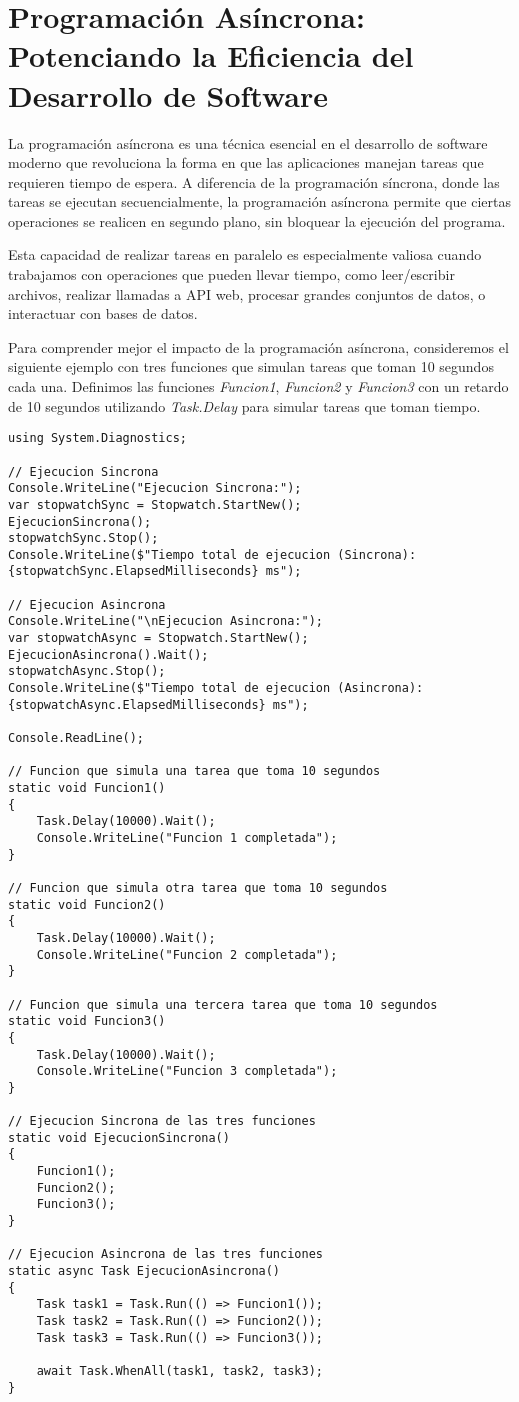 \documentclass[executivepaper]{article}
\begin{document}
\section{Programación Asíncrona: Potenciando la Eficiencia del Desarrollo de Software}

La programación asíncrona es una técnica esencial en el desarrollo de software moderno que revoluciona la forma en que las aplicaciones manejan tareas que requieren tiempo de espera. A diferencia de la programación síncrona, donde las tareas se ejecutan secuencialmente, la programación asíncrona permite que ciertas operaciones se realicen en segundo plano, sin bloquear la ejecución del programa.

Esta capacidad de realizar tareas en paralelo es especialmente valiosa cuando trabajamos con operaciones que pueden llevar tiempo, como leer/escribir archivos, realizar llamadas a API web, procesar grandes conjuntos de datos, o interactuar con bases de datos.

Para comprender mejor el impacto de la programación asíncrona, consideremos el siguiente ejemplo con tres funciones que simulan tareas que toman 10 segundos cada una. Definimos las funciones \emph{Funcion1}, \emph{Funcion2} y \emph{Funcion3} con un retardo de 10 segundos utilizando \emph{Task.Delay} para simular tareas que toman tiempo.

\begin{lstlisting}
using System.Diagnostics;

// Ejecucion Sincrona
Console.WriteLine("Ejecucion Sincrona:");
var stopwatchSync = Stopwatch.StartNew();
EjecucionSincrona();
stopwatchSync.Stop();
Console.WriteLine($"Tiempo total de ejecucion (Sincrona): {stopwatchSync.ElapsedMilliseconds} ms");

// Ejecucion Asincrona
Console.WriteLine("\nEjecucion Asincrona:");
var stopwatchAsync = Stopwatch.StartNew();
EjecucionAsincrona().Wait();
stopwatchAsync.Stop();
Console.WriteLine($"Tiempo total de ejecucion (Asincrona): {stopwatchAsync.ElapsedMilliseconds} ms");

Console.ReadLine();

// Funcion que simula una tarea que toma 10 segundos
static void Funcion1()
{
    Task.Delay(10000).Wait();
    Console.WriteLine("Funcion 1 completada");
}

// Funcion que simula otra tarea que toma 10 segundos
static void Funcion2()
{
    Task.Delay(10000).Wait();
    Console.WriteLine("Funcion 2 completada");
}

// Funcion que simula una tercera tarea que toma 10 segundos
static void Funcion3()
{
    Task.Delay(10000).Wait();
    Console.WriteLine("Funcion 3 completada");
}

// Ejecucion Sincrona de las tres funciones
static void EjecucionSincrona()
{
    Funcion1();
    Funcion2();
    Funcion3();
}

// Ejecucion Asincrona de las tres funciones
static async Task EjecucionAsincrona()
{
    Task task1 = Task.Run(() => Funcion1());
    Task task2 = Task.Run(() => Funcion2());
    Task task3 = Task.Run(() => Funcion3());

    await Task.WhenAll(task1, task2, task3);
}
\end{lstlisting}
\end{document}
